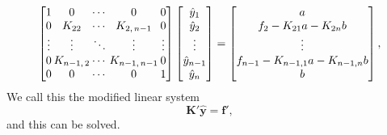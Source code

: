 \documentclass[acmtog]{acmart}
\begin{document}
\begin{equation}
  \begin{bmatrix}
    1      & \hspace{-8pt} 0            & \hspace{-8pt}\cdots & \hspace{-8pt} 0               & \hspace{-8pt} 0      \\
    0      & \hspace{-8pt} K_{22}       & \hspace{-8pt}\cdots & \hspace{-8pt} K_{2, \, n-1}   & \hspace{-8pt} 0      \\
    \vdots & \hspace{-8pt} \vdots       & \hspace{-8pt}\ddots & \hspace{-8pt} \vdots          & \hspace{-8pt} \vdots \\
    0      & \hspace{-8pt} K_{n-1, \,2} & \hspace{-8pt}\cdots & \hspace{-8pt} K_{n-1, \, n-1} & \hspace{-8pt} 0      \\
    0      & \hspace{-8pt} 0            & \hspace{-8pt}\cdots & \hspace{-8pt} 0               & \hspace{-8pt} 1
  \end{bmatrix}
  \begin{bmatrix}
    \hat{y}_1     \\
    \hat{y}_2     \\
    \vdots        \\
    \hat{y}_{n-1} \\
    \hat{y}_n
  \end{bmatrix} = \begin{bmatrix}
    a                                     \\
    f_2 - K_{21} a - K_{2n} b             \\
    \vdots                                \\
    f_{n-1} - K_{n-1, 1} a - K_{n-1, n} b \\
    b
  \end{bmatrix},
\end{equation}
%
We call this the modified linear system
%
\begin{equation}
  \boldsymbol {K'} \boldsymbol {\hat{y}} = \mathbf{f'},
\end{equation}
%
and this can be solved.
\end{document}
